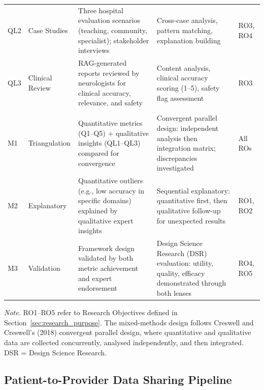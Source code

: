 {\begin{xltabular}{\textwidth}{@{} >{\raggedright\arraybackslash}p{1.0cm} >{\raggedright\arraybackslash}p{2.0cm} p{4.7cm} p{5.0cm} >{\raggedright\arraybackslash}p{2.0cm} @{}}
\addlinespace
QL2 & Case Studies & Three hospital evaluation scenarios (teaching, community, specialist); stakeholder interviews & Cross-case analysis, pattern matching, explanation building & RO3, RO4 \\
\addlinespace
QL3 & Clinical Review & RAG-generated reports reviewed by neurologists for clinical accuracy, relevance, and safety & Content analysis, clinical accuracy scoring (1--5), safety flag assessment & RO3 \\
\midrule
{} \\
\addlinespace
M1 & Triangulation & Quantitative metrics (Q1--Q5) + qualitative insights (QL1--QL3) compared for convergence & Convergent parallel design: independent analysis then integration matrix; discrepancies investigated & All ROs \\
\addlinespace
M2 & Explanatory & Quantitative outliers (e.g., low accuracy in specific domains) explained by qualitative expert insights & Sequential explanatory: quantitative first, then qualitative follow-up for unexpected results & RO1, RO2 \\
\addlinespace
M3 & Validation & Framework design validated by both metric achievement and expert endorsement & Design Science Research (DSR) evaluation: utility, quality, efficacy demonstrated through both lenses & RO4, RO5 \\
\end{xltabular}}
\vspace{0.5em}
\noindent\textit{Note.} RO1--RO5 refer to Research Objectives defined in Section~\ref{sec:research_purpose}. The mixed-methods design follows Creswell and Creswell's (2018) convergent parallel design, where quantitative and qualitative data are collected concurrently, analysed independently, and then integrated. DSR = Design Science Research.
\fi %

\label{sec:research_methodology_approach}
\label{tab:research_approach}

\subsection{Patient-to-Provider Data Sharing Pipeline}
\label{sec:sharing_pipeline}

